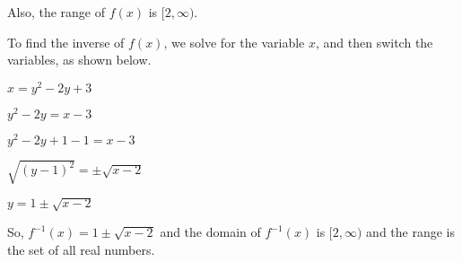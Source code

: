 \documentclass[10pt]{article} %
\newcommand{\points}[1]{{\it (#1 Points)}}
\begin{document}
\begin{enumerate}
\begin{enumerate}
Also, the range of $f(x)$ is $[2,\infty)$.  

To find the inverse of $f(x)$, we solve for the variable $x$, and then switch the variables, as shown below.  

$x=y^2-2y+3$

$y^2-2y=x-3$

$y^2-2y+1-1=x-3$

$\sqrt{(y-1)^2}=\pm \sqrt{x-2}$

$y=1\pm \sqrt{x-2}$

So, $f^{-1}(x)=1\pm \sqrt{x-2}$ and the domain of $f^{-1}(x)$ is $[2,\infty)$ and the range is the set of all real numbers.  

  
\end{enumerate}



\end{enumerate}
\end{document}
